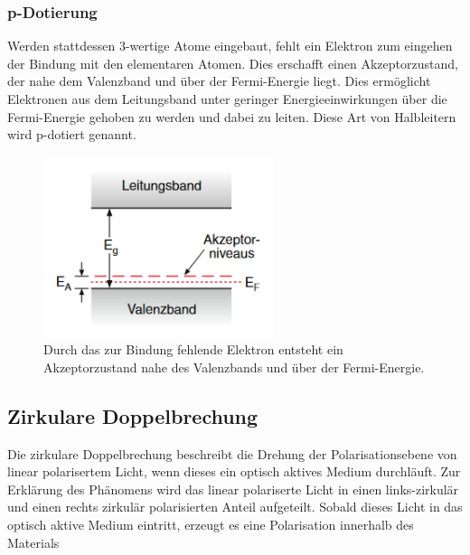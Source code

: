              \FloatBarrier



            \subsubsection*{p-Dotierung}
            Werden stattdessen 3-wertige Atome eingebaut, fehlt ein Elektron zum eingehen der Bindung mit den elementaren Atomen. Dies erschafft einen Akzeptorzustand, der nahe dem Valenzband und über der 
            Fermi-Energie liegt. Dies ermöglicht Elektronen aus dem Leitungsband unter geringer Energieeinwirkungen über die Fermi-Energie gehoben zu werden und dabei zu leiten. Diese Art von Halbleitern wird 
            p-dotiert genannt.

            \FloatBarrier

            \begin{figure}[h]
                \centering
                \includegraphics[width = 0.6\textwidth]{pictures/akzeptor.png}
                \caption{Durch das zur Bindung fehlende Elektron entsteht ein Akzeptorzustand nahe des Valenzbands und über der Fermi-Energie.}
                \label{fig:Akzeptor}
            \end{figure}
    
            \FloatBarrier


    \subsection{Zirkulare Doppelbrechung}
        Die zirkulare Doppelbrechung beschreibt die Drehung der Polarisationsebene von linear polarisertem Licht, wenn dieses ein optisch aktives Medium durchläuft. Zur Erklärung des Phänomens wird das linear 
        polariserte Licht in einen links-zirkulär und einen rechts zirkulär polarisierten Anteil aufgeteilt. Sobald dieses Licht in das optisch aktive Medium eintritt, erzeugt es eine Polarisation
        innerhalb des Materials

